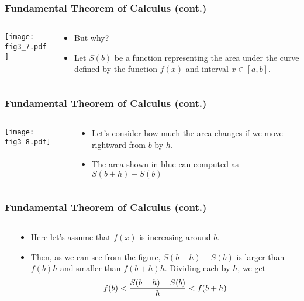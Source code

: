 \documentclass[pdflatex, 12pt]{beamer}
\begin{document}
\begin{frame}
\frametitle{Fundamental Theorem of Calculus (cont.)}
\begin{columns}
\begin{column}{0.5\textwidth}
\texttt{[image: fig3\_7.pdf]}
\end{column}
\begin{column}{0.5\textwidth}
\begin{itemize}
\item But why?
\vspace{0.4cm}
\item Let $S(b)$ be a function representing the area under the curve defined by the function $f(x)$ and interval $x \in [a, b]$.
\end{itemize}
\end{column}
\end{columns}
\end{frame}

\begin{frame}
\frametitle{Fundamental Theorem of Calculus (cont.)}
\begin{columns}
\begin{column}{0.5\textwidth}
\texttt{[image: fig3\_8.pdf]}
\end{column}
\begin{column}{0.5\textwidth}
\begin{itemize}
\item Let's consider how much the area changes if we move rightward from $b$ by $h$.
\vspace{0.4cm}
\item The area shown in blue can computed as $S(b + h) - S(b)$
\end{itemize}
\end{column}
\end{columns}
\end{frame}

\begin{frame}
\frametitle{Fundamental Theorem of Calculus (cont.)}
\begin{columns}
\begin{column}{0.5\textwidth}
\end{column}
\begin{column}{0.5\textwidth}
\begin{itemize}
\item Here let's assume that $f(x)$ is increasing around $b$.
\vspace{0.4cm}
\item Then, as we can see from the figure, $S(b + h) - S(b)$ is larger than $f(b)h$ and smaller than $f(b + h)h$. Dividing each by $h$, we get
 {\footnotesize
 \begin{equation}
 f(b) < \frac{S(b + h) - S(b)}{h} < f(b + h) \notag
 \end{equation}
 }
\end{itemize}
\end{column}
\end{columns}
\end{frame}
\end{document}
